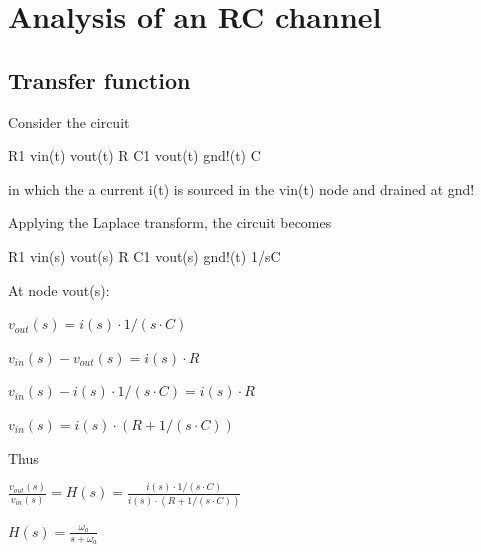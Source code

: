 \documentclass{article}
\begin{document}
\section*{Analysis of an RC channel} %

\subsection{Transfer function}

Consider the circuit

\begin{info} \newline
	R1 vin(t) vout(t) R \newline
	C1 vout(t) gnd!(t) C
\end{info}

in which the a current i(t) is sourced in the vin(t) node and drained at gnd!

Applying the Laplace transform, the circuit becomes

\begin{info} \newline
	R1 vin(s) vout(s) R \newline
	C1 vout(s) gnd!(t) 1/sC
\end{info}

At node vout(s):

\centerline{$ v_{out}(s) = i(s) \cdot 1/(s \cdot C)
	$}
\vspace{\baselineskip}

\centerline{$ v_{in}(s) - v_{out}(s) = i(s) \cdot R
	$}
\vspace{\baselineskip}

\centerline{$ v_{in}(s) - i(s) \cdot 1/(s \cdot C) = i(s) \cdot R
	$}
\vspace{\baselineskip}

\centerline{$ v_{in}(s) = i(s) \cdot (R + 1/(s \cdot C))
	$}
\vspace{\baselineskip}

Thus

\centerline{$ \frac{v_{out}(s)}{v_{in}(s)} = H(s) = \frac{i(s) \cdot 1/(s \cdot C)}{i(s) \cdot (R + 1/(s \cdot C))}
	$}
\vspace{\baselineskip}

\begin{question}
\centerline{$ H(s) = \frac{\omega_{a}}{s + \omega_{a}}
	$}
\end{question}
\end{document}
